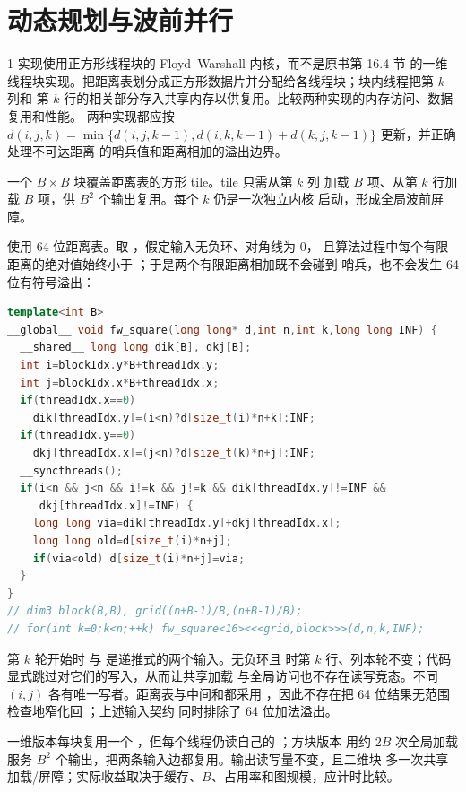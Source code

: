 \chapter{动态规划与波前并行}

\begin{solutionexercise}{1}
\problemheading 实现使用正方形线程块的 Floyd--Warshall 内核，而不是原书第 16.4 节
的一维线程块实现。把距离表划分成正方形数据片并分配给各线程块；块内线程把第 $k$ 列和
第 $k$ 行的相关部分存入共享内存以供复用。比较两种实现的内存访问、数据复用和性能。
两种实现都应按
$d(i,j,k)=\min\{d(i,j,k-1),d(i,k,k-1)+d(k,j,k-1)\}$ 更新，并正确处理不可达距离
的哨兵值和距离相加的溢出边界。

\approachheading 一个 $B\times B$ 块覆盖距离表的方形 tile。tile 只需从第 $k$ 列
加载 $B$ 项、从第 $k$ 行加载 $B$ 项，供 $B^2$ 个输出复用。每个 $k$ 仍是一次独立内核
启动，形成全局波前屏障。

\answerheading 使用 64 位距离表。取 ，假定输入无负环、对角线为 0，
且算法过程中每个有限距离的绝对值始终小于 ；于是两个有限距离相加既不会碰到
哨兵，也不会发生 64 位有符号溢出：
\begin{lstlisting}[language=C++]
template<int B>
__global__ void fw_square(long long* d,int n,int k,long long INF) {
  __shared__ long long dik[B], dkj[B];
  int i=blockIdx.y*B+threadIdx.y;
  int j=blockIdx.x*B+threadIdx.x;
  if(threadIdx.x==0)
    dik[threadIdx.y]=(i<n)?d[size_t(i)*n+k]:INF;
  if(threadIdx.y==0)
    dkj[threadIdx.x]=(j<n)?d[size_t(k)*n+j]:INF;
  __syncthreads();
  if(i<n && j<n && i!=k && j!=k && dik[threadIdx.y]!=INF &&
     dkj[threadIdx.x]!=INF) {
    long long via=dik[threadIdx.y]+dkj[threadIdx.x];
    long long old=d[size_t(i)*n+j];
    if(via<old) d[size_t(i)*n+j]=via;
  }
}
// dim3 block(B,B), grid((n+B-1)/B,(n+B-1)/B);
// for(int k=0;k<n;++k) fw_square<16><<<grid,block>>>(d,n,k,INF);
\end{lstlisting}
第 $k$ 轮开始时  与  是递推式的两个输入。无负环且
 时第 $k$ 行、列本轮不变；代码显式跳过对它们的写入，从而让共享加载
与全局访问也不存在读写竞态。不同 $(i,j)$ 各有唯一写者。距离表与中间和都采用
，因此不存在把 64 位结果无范围检查地窄化回 ；上述输入契约
同时排除了 64 位加法溢出。

一维版本每块复用一个 ，但每个线程仍读自己的 ；方块版本
用约 $2B$ 次全局加载服务 $B^2$ 个输出，把两条输入边都复用。输出读写量不变，且二维块
多一次共享加载/屏障；实际收益取决于缓存、$B$、占用率和图规模，应计时比较。


\end{solutionexercise}
